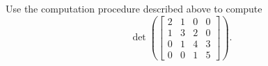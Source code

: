 \begin{exercise}
  \label{ex:hw05:four-by-four-determinant}
  Use the computation procedure described above to compute
  \[
    \det\left(\begin{bmatrix}
      2&1&0&0\\
      1&3&2&0\\
      0&1&4&3\\
      0&0&1&5
    \end{bmatrix}\right).
  \]
\end{exercise}
